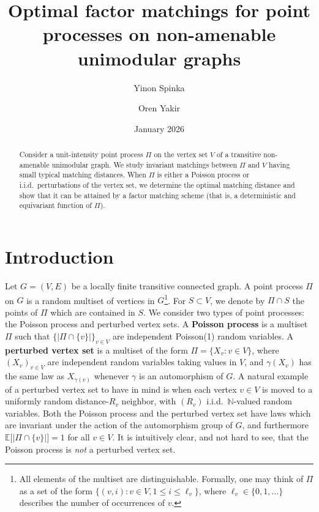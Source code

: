\documentclass[11pt, reqno]{article}
\title{Optimal factor matchings for point processes on non-amenable unimodular graphs}
\author{Yinon Spinka \and Oren Yakir}
\date{January 2026}
\numberwithin{equation}{section}
\theoremstyle{definition}
\def\E{\mathbb{E}}
\def\N{\mathbb{N}}
\newcommand{\1}{\mathds{1}}
\begin{document}
\maketitle

\begin{abstract}
Consider a unit-intensity point process $\Pi$ on the vertex set $V$ of a transitive non-amenable unimodular graph. We study invariant matchings between $\Pi$ and $V$ having small typical matching distances. When $\Pi$ is either a Poisson process or i.i.d.\ perturbations of the vertex set, we determine the optimal matching distance and show that it can be attained by a factor matching scheme (that is, a deterministic and equivariant function of $\Pi$).  
\end{abstract}

\section{Introduction}
\label{sec:intro}

Let $G = (V,E)$ be a locally finite transitive connected graph. A point process $\Pi$ on $G$ is a random multiset of vertices in $G$\footnote{All elements of the multiset are distinguishable. Formally, one may think of $\Pi$ as a set of the form $\{(v,i) : v \in V, 1 \le i \le \ell_v\}$, where $\ell_v \in \{0,1,\dots\}$ describes the number of occurrences of $v$.}. For $S\subset V$, we denote by $\Pi \cap S$ the points of $\Pi$ which are contained in $S$. We consider two types of point processes: the Poisson process and perturbed vertex sets. A \textbf{Poisson process} is a multiset $\Pi$ such that $\big\{|\Pi \cap \{v\}| \big\}_{v \in V}$ are independent Poisson(1) random variables.
A \textbf{perturbed vertex set} is a multiset of the form $\Pi=\{X_v : v \in V\}$, where $(X_v)_{v \in V}$ are independent random variables taking values in $V$, and $\gamma(X_v)$ has the same law as $X_{\gamma(v)}$ whenever $\gamma$ is an automorphism of $G$.
A natural example of a perturbed vertex set to have in mind is when each vertex $v\in V$ is moved to a uniformly random distance-$R_v$ neighbor, with $(R_v)$ i.i.d.\ $\N$-valued random variables. Both the Poisson process and the perturbed vertex set have laws which are invariant under the action of the automorphism group of $G$, and furthermore
$\E\big[|\Pi\cap \{v\}|\big] = 1$ for all $v\in V$.  
It is intuitively clear, and not hard to see, that the Poisson process is \emph{not} a perturbed vertex set.
\end{document}
